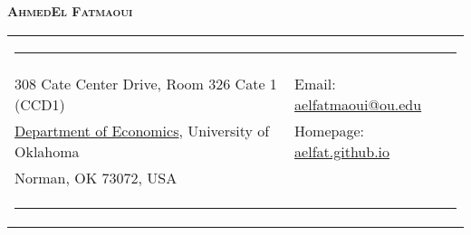 \documentclass[10pt,letterpaper]{article}
\begin{document}
\begin{center}
{ \Large \textsc{\textbf{\hspace{0.005in} Ahmed}}\hspace{0.1in}\textsc{\textbf{El Fatmaoui}}}
\end{center}





\begin{tabular}{p{4.85in}p{4in}}
\multicolumn{2}{p{7.5in}}{\hrule}\\
308 Cate Center Drive, Room 326 Cate 1 (CCD1) &  Email: \href{mailto:aelfatmaoui@ou.edu}{aelfatmaoui@ou.edu} \\
\href{https://www.ou.edu/cas/economics}{Department of Economics}, University of Oklahoma & Homepage: \href{https://aelfat.github.io/}{aelfat.github.io} \\
Norman, OK 73072, USA  & \\
\multicolumn{2}{p{7.5in}}{\hrule}\\
\end{tabular}
\end{document}
